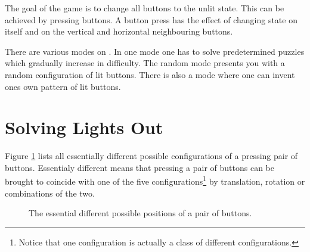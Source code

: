 The goal of the game is to change all buttons to the unlit state. This can be
achieved by pressing buttons. A button press has the effect of changing state on
itself and on the vertical and horizontal neighbouring buttons.

There are various modes on \lo. In one mode one has to solve predetermined
puzzles which gradually increase in difficulty. The random mode presents you
with a random configuration of lit buttons. There is also a mode where one can
invent ones own pattern of lit buttons. 

\section{Solving Lights Out}

Figure \ref{figure:pairs} lists all essentially different possible
configurations of a pressing pair of buttons. Essentialy different means that
pressing a pair of buttons can be brought to coincide with one of the five
configurations\footnote{Notice that one configuration is actually a class of
different configurations.} by translation, rotation or combinations of the two.
\begin{figure}
	\begin{center}
		\hfill
		\hfill
		\hfill
		\hfill
		\label{figure:sub:zero}
	\end{center}
	\caption{The essential different possible positions of a pair of
	buttons.}\label{figure:pairs}
\end{figure}

